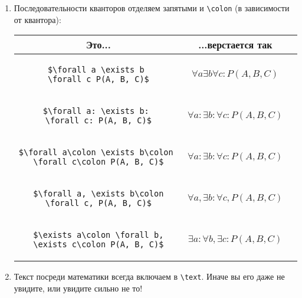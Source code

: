 \begin{enumerate}
\item
	Последовательности кванторов отделяем запятыми и \verb'\colon' (в зависимости от квантора):
	\begin{center}\begin{tabular}{|c|c|c|}
		\hline Это... & ...верстается так & \\
		\hline \begin{minipage}{0.5\linewidth}
\begin{verbatim}
$\forall a \exists b 
\forall c P(A, B, C)$
\end{verbatim}
		\end{minipage} & $\forall a \exists b \forall c: P(A, B, C)$ \bad \\
		\hline \begin{minipage}{0.5\linewidth}
\begin{verbatim}
$\forall a: \exists b: 
\forall c: P(A, B, C)$
\end{verbatim}
		\end{minipage} & $\forall a: \exists b: \forall c: P(A, B, C)$ \bad \\
		\hline \begin{minipage}{0.5\linewidth}
\begin{verbatim}
$\forall a\colon \exists b\colon 
\forall c\colon P(A, B, C)$
\end{verbatim}
		\end{minipage} & $\forall a\colon \exists b\colon \forall c\colon P(A, B, C)$ \bad \\
		\hline \begin{minipage}{0.5\linewidth}
\begin{verbatim}
$\forall a, \exists b\colon
\forall c, P(A, B, C)$
\end{verbatim}
		\end{minipage} & $\forall a, \exists b\colon \forall c, P(A, B, C)$ \ok \\
		\hline \begin{minipage}{0.5\linewidth}
\begin{verbatim}
$\exists a\colon \forall b,
\exists c\colon P(A, B, C)$
\end{verbatim}
		\end{minipage} & $\exists a\colon \forall b, \exists c\colon P(A, B, C)$ \ok \\
		\hline
	\end{tabular}\end{center}

\item
	Текст посреди математики всегда включаем в \verb'\text'.
	Иначе вы его даже не увидите, или увидите сильно не то!


\end{enumerate}
